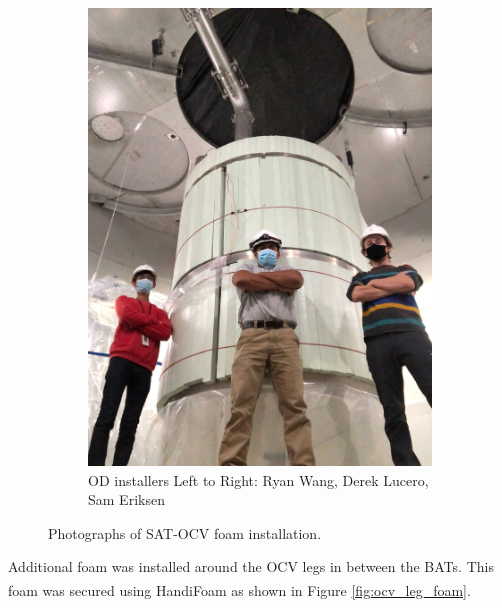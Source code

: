 \begin{figure}[!htbp]
\begin{subfigure}{.5\textwidth}
  \includegraphics[width=\linewidth]{Figures/Construction/SAT_foam_fittest.jpg}
  \caption{OD installers Left to Right: Ryan Wang, Derek Lucero, Sam Eriksen}
  \label{fig:SAT_foam_guys}
  \end{subfigure}
\caption{Photographs of SAT-OCV foam installation.}
\label{fig:SAT_foam_installation}
\end{figure}

\par
Additional foam was installed around the OCV legs in between the BATs.
This foam was secured using HandiFoam\textsuperscript{\textregistered} as shown in Figure \ref{fig:ocv_leg_foam}.

